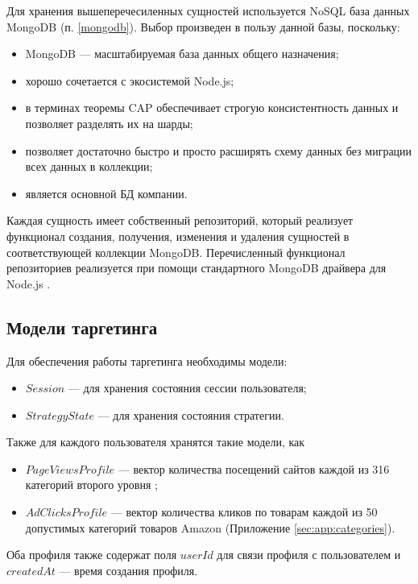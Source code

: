 \documentclass[specification,annotation,times]{itmo-student-thesis}
\begin{document}

Для хранения вышеперечесиленных сущностей используется NoSQL база данных MongoDB (п. \ref{mongodb}). Выбор произведен в пользу данной базы, поскольку:
\begin{itemize}
\item MongoDB — масштабируемая база данных общего назначения;
\item хорошо сочетается с экосистемой Node.js;
\item в терминах теоремы CAP \cite{CAP-theorem} обеспечивает строгую консистентность данных и позволяет разделять их на шарды;
\item позволяет достаточно быстро и просто расширять схему данных без миграции всех данных в коллекции;
\item является основной БД компании.
\end{itemize}

Каждая сущность имеет собственный репозиторий, который реализует функционал создания, получения, изменения и удаления сущностей в соответствующей коллекции MongoDB. Перечисленный функционал репозиториев реализуется при помощи стандартного MongoDB драйвера для Node.js \cite{node-mongodb-native}. 

\subsection{Модели таргетинга}

Для обеспечения работы таргетинга необходимы модели: 
\begin{itemize}
\item $Session$  — для хранения состояния сессии пользователя;
\item $StrategyState$ — для хранения состояния стратегии.
\end{itemize}



Также для каждого пользователя хранятся такие модели, как
\begin{itemize}
\item $PageViewsProfile$ — вектор количества посещений сайтов каждой из 316 категорий второго уровня \cite{categories-hierarchy};
\item $AdClicksProfile$ — вектор количества кликов по товарам каждой из 50 допустимых категорий товаров Amazon (Приложение \ref{sec:app:categories}).
\end{itemize}
Оба профиля также содержат поля $userId$ для связи профиля с пользователем и $createdAt$  — время создания профиля.
\end{document}
